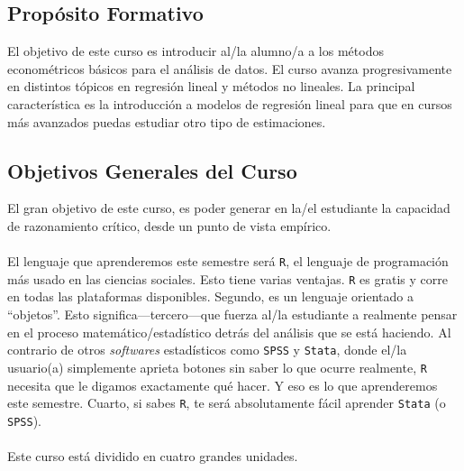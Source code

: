 \documentclass[letterpaper]{article}
\begin{document}
\subsection*{Prop\'osito Formativo}

El objetivo de este curso es introducir al/la alumno/a a los m\'etodos econom\'etricos b\'asicos para el an\'alisis de datos. El curso avanza progresivamente en distintos t\'opicos en regresi\'on lineal y m\'etodos no lineales. La principal caracter\'istica es la introducci\'on a modelos de regresi\'on lineal para que en cursos m\'as avanzados puedas estudiar otro tipo de estimaciones.


\subsection*{Objetivos Generales del Curso}

El gran objetivo de este curso, es poder generar en la/el estudiante la capacidad de razonamiento cr\'itico, desde un punto de vista emp\'irico. 
\\
\\
El lenguaje que aprenderemos este semestre ser\'a \texttt{R}, el lenguaje de programaci\'on m\'as usado en las ciencias sociales. Esto tiene varias ventajas. \texttt{R} es gratis y corre en todas las plataformas disponibles. Segundo, es un lenguaje orientado a ``objetos''. Esto significa---tercero---que fuerza al/la estudiante a realmente pensar en el proceso matem\'atico/estad\'istico detr\'as del an\'alisis que se est\'a haciendo. Al contrario de otros \emph{softwares} estad\'isticos como \texttt{SPSS} y \texttt{Stata}, donde el/la usuario(a) simplemente aprieta botones sin saber lo que ocurre realmente, \texttt{R} necesita que le digamos exactamente qu\'e hacer. Y eso es lo que aprenderemos este semestre. Cuarto, si sabes \texttt{R}, te ser\'a absolutamente f\'acil aprender \texttt{Stata} (o \texttt{SPSS}).
\\
\\
Este curso est\'a dividido en cuatro grandes unidades.
\end{document}
